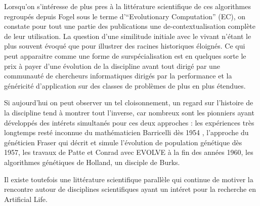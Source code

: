Lorsqu'on s'intéresse de plus pres à la littérature scientifique de ces algorithmes regroupés depuis Fogel sous le terme d'\foreignquote{english}{Evolutionary Computation} (EC), on constate pour tout une partie des publications une de-contextualisation complète de leur utilisation. La question d'une similitude initiale avec le vivant n'étant le plus souvent évoqué que pour illustrer des racines historiques éloignés. Ce qui peut apparaitre comme une forme de surspécialisation est en quelques sorte le prix à payer d'une évolution de la discipline avant tout dirigé par une communauté de chercheurs informatiques dirigés par la performance et la généricité d'application sur des classes de problèmes de plus en plus étendues.

Si aujourd'hui on peut observer un tel cloisonnement, un regard sur l'histoire de la discipline tend à montrer tout l'inverse, car nombreux sont les pionniers ayant développés des intérets simultanés pour ces deux approches : les expériences très longtemps resté inconnue du mathématicien Barricelli dès 1954 , l'approche du généticien Fraser qui décrit et simule l'évolution de population génétique dès 1957, les travaux de Patte et Conrad avec EVOLVE à la fin des années 1960, les algorithmes génétiques  de Holland, un disciple de Burks.

Il existe toutefois une littérature scientifique parallèle qui continue de motiver la rencontre autour de disciplines scientifiques ayant un intéret pour la recherche en Artificial Life. 

